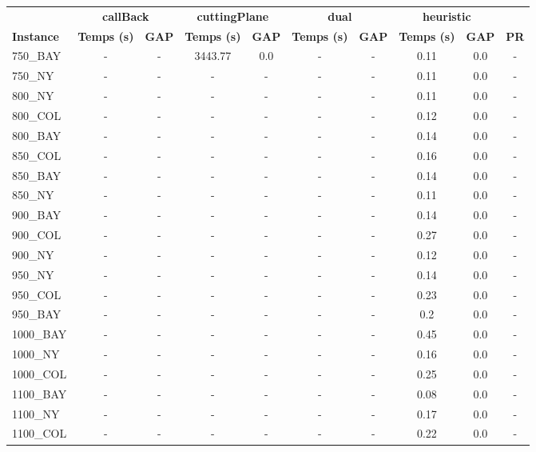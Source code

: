 \documentclass[main.tex]{subfiles}
\begin{document}
\begin{center}
\renewcommand{\arraystretch}{1.4} 
 \begin{tabular}{lccccccccc}
	\hline
 & \multicolumn{2}{c}{\textbf{callBack}} & \multicolumn{2}{c}{\textbf{cuttingPlane}} & \multicolumn{2}{c}{\textbf{dual}} & \multicolumn{2}{c}{\textbf{heuristic}}\\
\textbf{Instance}  & \textbf{Temps (s)} & \textbf{GAP} & \textbf{Temps (s)} & \textbf{GAP} & \textbf{Temps (s)} & \textbf{GAP} & \textbf{Temps (s)} & \textbf{GAP} & \textbf{PR} \\\hline

750\_BAY & - & - 
 & 3443.77 & 0.0 & - & - 
 & 0.11 & 0.0 & - \\
750\_NY & - & - 
 & - & - 
 & - & - 
 & 0.11 & 0.0 & - \\
800\_NY & - & - 
 & - & - 
 & - & - 
 & 0.11 & 0.0 & - \\
800\_COL & - & - 
 & - & - 
 & - & - 
 & 0.12 & 0.0 & - \\
800\_BAY & - & - 
 & - & - 
 & - & - 
 & 0.14 & 0.0 & - \\
850\_COL & - & - 
 & - & - 
 & - & - 
 & 0.16 & 0.0 & - \\
850\_BAY & - & - 
 & - & - 
 & - & - 
 & 0.14 & 0.0 & - \\
850\_NY & - & - 
 & - & - 
 & - & - 
 & 0.11 & 0.0 & - \\
900\_BAY & - & - 
 & - & - 
 & - & - 
 & 0.14 & 0.0 & - \\
900\_COL & - & - 
 & - & - 
 & - & - 
 & 0.27 & 0.0 & - \\
900\_NY & - & - 
 & - & - 
 & - & - 
 & 0.12 & 0.0 & - \\
950\_NY & - & - 
 & - & - 
 & - & - 
 & 0.14 & 0.0 & - \\
950\_COL & - & - 
 & - & - 
 & - & - 
 & 0.23 & 0.0 & - \\
950\_BAY & - & - 
 & - & - 
 & - & - 
 & 0.2 & 0.0 & - \\
1000\_BAY & - & - 
 & - & - 
 & - & - 
 & 0.45 & 0.0 & - \\
1000\_NY & - & - 
 & - & - 
 & - & - 
 & 0.16 & 0.0 & - \\
1000\_COL & - & - 
 & - & - 
 & - & - 
 & 0.25 & 0.0 & - \\
1100\_BAY & - & - 
 & - & - 
 & - & - 
 & 0.08 & 0.0 & - \\
1100\_NY & - & - 
 & - & - 
 & - & - 
 & 0.17 & 0.0 & - \\
1100\_COL & - & - 
 & - & - 
 & - & - 
 & 0.22 & 0.0 & - \\

\end{tabular}
\end{center}
\end{document}
